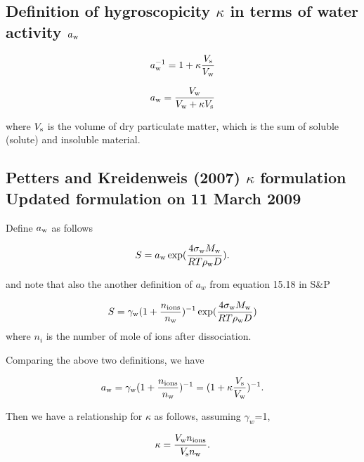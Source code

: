 \documentclass[12pt]{article}
\begin{document}


\subsection{Definition of hygroscopicity $\kappa$ in terms of water activity $a_{\rm w}$}

\begin{equation}\label{eqn:17}
a_{\rm w}^{-1}=1+\kappa \frac{V_{\rm s}}{V_{\rm w}}
\end{equation}

\begin{equation}\label{eqn:18}
a_{\rm w}=\frac{V_{\rm w}}{V_{\rm w} + \kappa V_{\rm s}}
\end{equation}

where $V_{\rm s}$ is the volume of dry particulate matter, which is the sum of soluble (solute) and insoluble material.

\subsection{Petters and Kreidenweis (2007) $\kappa$ formulation Updated formulation on 11 March 2009}

Define $a_{\rm w}$ as follows 

\begin{equation}
S=a_{\rm w} \exp (\frac{4 \sigma_{\rm w} M_{\rm w}} {RT\rho_{\rm w}D}).
\end{equation}

and note that also the another definition of $a_{w}$ from equation 15.18 in S\&P

\begin{equation}
S=\gamma_{\rm w}(1+ \frac{n_{\rm ions}}{n_{\rm w}})^{-1}\exp (\frac{4 \sigma_{\rm w} M_{\rm w}} {RT\rho_{\rm w} D})
\end{equation}
where $n_{i}$ is the number of mole of ions after dissociation.

Comparing the above two definitions, we have

\begin{equation}
a_{\rm w}=\gamma_{\rm w}(1+\frac{n_{\rm ions}}{n_{\rm w}})^{-1}=(1+\kappa \frac{V_{\rm s}}{V_{\rm w}})^{-1}.
\end{equation}

Then we have a relationship for $\kappa$ as follows, assuming $\gamma_{w}$=1, 

\begin{equation}
\kappa= \frac{V_{\rm w} n_{\rm ions}}{V_{\rm s} n_{\rm w}}.
\end{equation}
\end{document}
